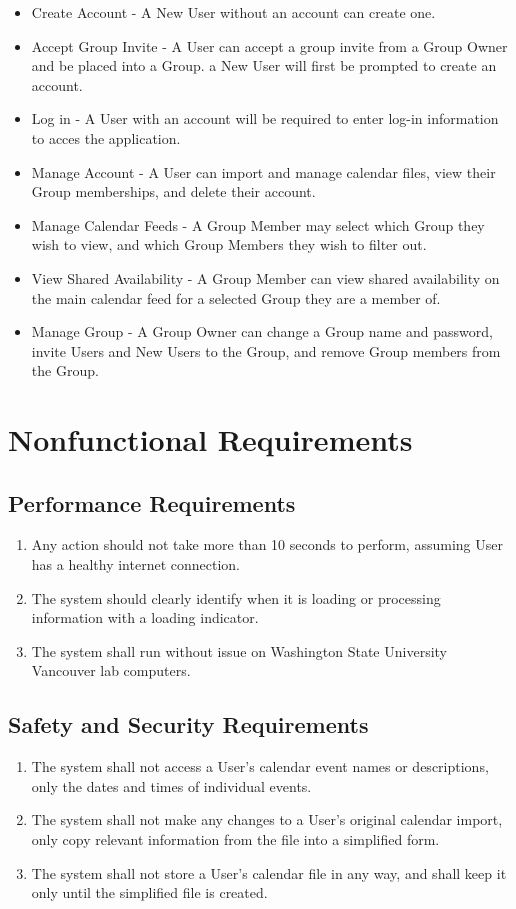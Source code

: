 \documentclass{scrreprt}
\begin{document}
\begin{itemize}
\item Create Account - A New User without an account can create one.
\item Accept Group Invite - A User can accept a group invite from a Group Owner and be placed into a Group.
a New User will first be prompted to create an account.
\item Log in - A User with an account will be required to enter log-in information to acces the application.
\item Manage Account - A User can import and manage calendar files, view their Group memberships, and delete
their account.
\item Manage Calendar Feeds - A Group Member may select which Group they wish to view, and which Group
Members they wish to filter out.
\item View Shared Availability - A Group Member can view shared availability on the main calendar feed for a
selected Group they are a member of.
\item Manage Group - A Group Owner can change a Group name and password, invite Users and New Users to the
Group, and remove Group members from the Group.
\end{itemize}

\chapter{Nonfunctional Requirements}

\section{Performance Requirements}
\begin{enumerate}
\item Any action should not take more than 10 seconds to perform, assuming User
has a healthy internet connection.
\item The system should clearly identify when it is loading or processing
information with a loading indicator.
\item The system shall run without issue on Washington State University Vancouver
lab computers.
\end{enumerate}

\section{Safety and Security Requirements}
\begin{enumerate}
\item The system shall not access a User's calendar event names or descriptions,
only the dates and times of individual events.
\item The system shall not make any changes to a User's original calendar import,
only copy relevant information from the file into a simplified form.
\item The system shall not store a User's calendar file in any way, and shall
keep it only until the simplified file is created.
\end{enumerate}
\end{document}
